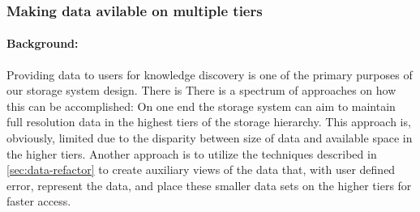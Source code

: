 
\subsubsection{Making data avilable on multiple tiers}
\label{sec:manag-data-mult}

\paragraph{Background:} Providing data to users for knowledge discovery is
one of the primary purposes of our storage system design. There is
There is a
spectrum of approaches on how
this can be accomplished: On one end the storage system can aim to maintain
full resolution data in the highest tiers of the storage hierarchy. This
approach is, obviously, limited due to the disparity between size of data
and available space in the higher tiers. Another approach is to utilize the
techniques described in \ref{sec:data-refactor} to create auxiliary views of
the data that, with user defined error, represent the data, and place these
smaller data sets on the higher tiers for faster access. 

